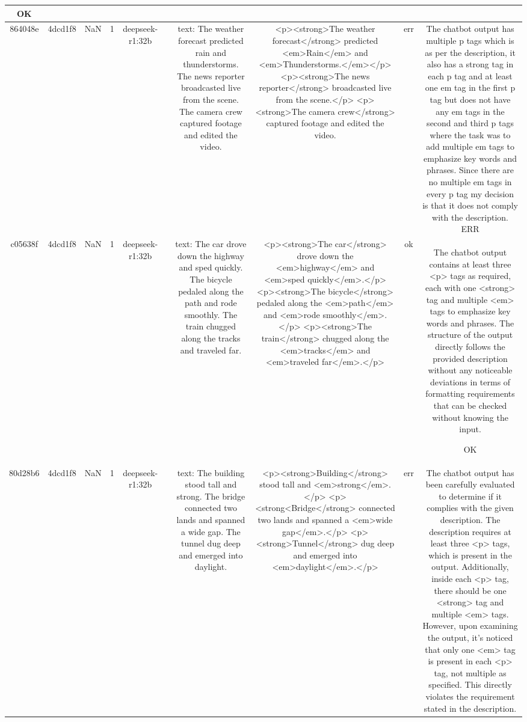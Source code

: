 \begin{table}[h!]
\begin{tabular}{|c|c|c|c|c|c|c|c|c|c|}
OK\\
\hline
864048e & 4dcd1f8 & NaN & 1 & deepseek-r1:32b &  & text: The weather forecast predicted rain and thunderstorms. The news reporter broadcasted live from the scene. The camera crew captured footage and edited the video. & <p><strong>The weather forecast</strong> predicted <em>Rain</em> and <em>Thunderstorms.</em></p>
<p><strong>The news reporter</strong> broadcasted live from the scene.</p>
<p><strong>The camera crew</strong> captured footage and edited the video. & err & The chatbot output has multiple p tags which is as per the description, it also has a strong tag in each p tag and at least one em tag in the first p tag but does not have any em tags in the second and third p tags where the task was to add multiple em tags to emphasize key words and phrases. Since there are no multiple em tags in every p tag my decision is that it does not comply with the description.
ERR\\
\hline
c05638f & 4dcd1f8 & NaN & 1 & deepseek-r1:32b &  & text: The car drove down the highway and sped quickly. The bicycle pedaled along the path and rode smoothly. The train chugged along the tracks and traveled far. & <p><strong>The car</strong> drove down the <em>highway</em> and <em>sped quickly</em>.</p>
<p><strong>The bicycle</strong> pedaled along the <em>path</em> and <em>rode smoothly</em>.</p>
<p><strong>The train</strong> chugged along the <em>tracks</em> and <em>traveled far</em>.</p> & ok & The chatbot output contains at least three <p> tags as required, each with one <strong> tag and multiple <em> tags to emphasize key words and phrases. The structure of the output directly follows the provided description without any noticeable deviations in terms of formatting requirements that can be checked without knowing the input.

OK\\
\hline
80d28b6 & 4dcd1f8 & NaN & 1 & deepseek-r1:32b &  & text: The building stood tall and strong. The bridge connected two lands and spanned a wide gap. The tunnel dug deep and emerged into daylight. & <p><strong>Building</strong> stood tall and <em>strong</em>.</p>
<p><strong<Bridge</strong> connected two lands and spanned a <em>wide gap</em>.</p>
<p><strong>Tunnel</strong> dug deep and emerged into <em>daylight</em>.</p> & err & The chatbot output has been carefully evaluated to determine if it complies with the given description. The description requires at least three <p> tags, which is present in the output. Additionally, inside each <p> tag, there should be one <strong> tag and multiple <em> tags. However, upon examining the output, it's noticed that only one <em> tag is present in each <p> tag, not multiple as specified. This directly violates the requirement stated in the description.


\end{tabular}
\end{table}
